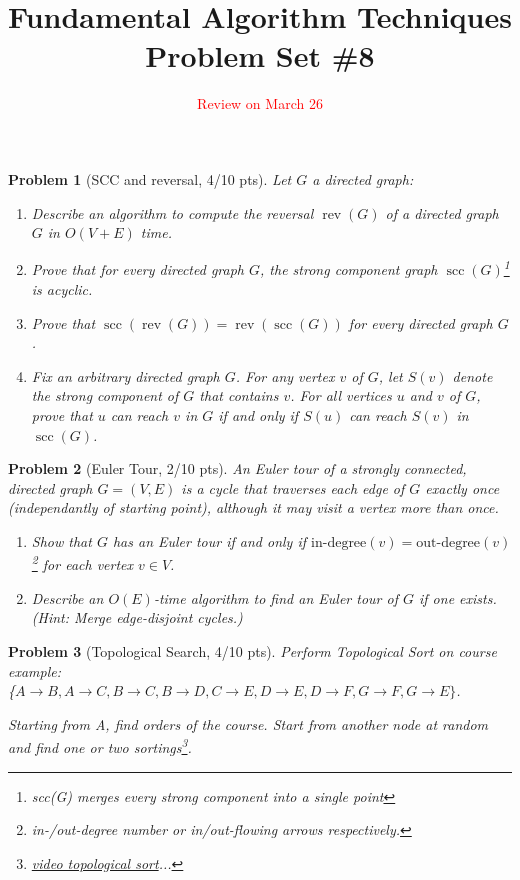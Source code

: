 \documentclass[11pt]{article}
\title{\textbf{Fundamental Algorithm Techniques} \\ Problem Set \#8} %
\date{\textcolor{red}{Review on March 26}} %
\newtheorem{problem}{Problem}
\begin{document}
\maketitle



\begin{problem}[SCC and reversal, 4/10 pts]
Let $G$ a directed graph: 
\begin{enumerate}
    \item Describe an algorithm to compute the reversal $\operatorname{rev}(G)$ of a directed graph $G$ in $O(V + E)$ time.
    
    \item Prove that for every directed graph $G$, the strong component graph $\operatorname{scc}(G)$\footnote{scc(G) merges every strong component into a single point} is acyclic.
    
    \item Prove that $\operatorname{scc}(\operatorname{rev}(G)) = \operatorname{rev}(\operatorname{scc}(G))$ for every directed graph $G$.
    
    \item Fix an arbitrary directed graph $G$. For any vertex $v$ of $G$, let $S(v)$ denote the strong component of $G$ that contains $v$. For all vertices $u$ and $v$ of $G$, prove that $u$ can reach $v$ in $G$ if and only if $S(u)$ can reach $S(v)$ in $\operatorname{scc}(G)$.
\end{enumerate}
\end{problem}


\begin{problem}[Euler Tour, 2/10 pts]

An Euler tour of a strongly connected, directed graph $G = (V, E)$ is a cycle that traverses each edge of $G$ exactly once (independantly of starting point), although it may visit a vertex more than once.

\begin{enumerate}
    \item Show that $G$ has an Euler tour if and only if $\text{in-degree}(v) = \text{out-degree}(v)$\footnote{in-/out-degree number or in/out-flowing arrows respectively.} for each vertex $v \in V$.
    
    \item Describe an $O(E)$-time algorithm to find an Euler tour of $G$ if one exists. (Hint: Merge edge-disjoint cycles.)
\end{enumerate}

\end{problem}

\begin{problem}[Topological Search, 4/10 pts]
Perform Topological Sort on course example: \\
\{$A\rightarrow B, A\rightarrow C, B \rightarrow C, B \rightarrow D, C \rightarrow E,  D \rightarrow E, D \rightarrow F, G \rightarrow F, G \rightarrow E\}$.

Starting from A, find orders of the course.
Start from another node at random and find one or two sortings\footnote{\href{https://www.youtube.com/watch?v=xqLY-ZLJig8}{video topological sort}...}.



\end{problem}
\end{document}
